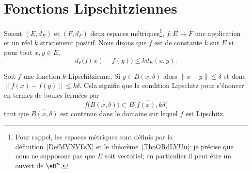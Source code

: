 
\section{Fonctions Lipschitziennes}


\begin{definition}      \label{DEFooQHVEooDbYKmz}
	Soient \( (E,d_E)\) et \( (F,d_F)\) deux espaces métriques\footnote{Pour rappel, les espaces métriques sont définis par la définition~\ref{DefMVNVFsX} et le théorème~\ref{ThoORdLYUu}; je précise que nous ne supposons pas que \( E\) soit vectoriel; en particulier il peut être un ouvert de \( \eR^n\).}, \( f\colon E\to F\) une application et un réel \( k\) strictement positif. Nous disons que \( f\) est  de constante \( k\) sur \( E\) si pour tout \( x,y\in E\),
	\begin{equation}
		d_F\big( f(x)-f(y) \big)\leq kd_E(x,y).
	\end{equation}
\end{definition}
Soit \( f\) une fonction \( k\)-Lipschitzienne. Si \( y\in \overline{ B(x,\delta)}\) alors \( \| x-y \|\leq\delta\) et donc \( \big\| f(x)-f(y) \big\|\leq k\delta\). Cela signifie que la condition Lipschitz pour s'énoncer en termes de boules fermées par
\begin{equation}    \label{EqDZvtUbn}
	f\big( \overline{ B(x,\delta) } \big)\subset \overline{  B\big( f(x),k\delta \big) }
\end{equation}
tant que \( \overline{ B(x,\delta) } \) est contenue dans le domaine sur lequel \( f\) est Lipschitz.

